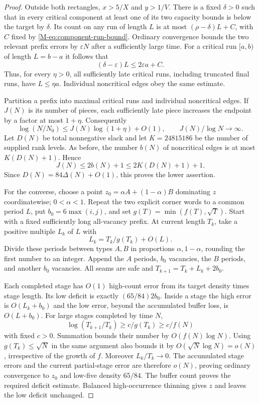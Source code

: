 \documentclass[11pt,reqno]{amsart}
\theoremstyle{plain}
\theoremstyle{plain}
\theoremstyle{plain}
\begin{document}
\begin{proof}
Outside both rectangles, $x>5/X$ and $y>1/V$. There is a fixed
$\delta>0$ such that in every critical component at least one of its
two capacity bounds is below the target by $\delta$. Its count on
any run of length $L$ is at most $(\rho-\delta)L+C$, with $C$ fixed
by \eqref{M-eq:component-run-bound}. Ordinary convergence bounds the
two relevant prefix errors by $\varepsilon N$ after a sufficiently
large time. For a critical run $[a,b)$ of length $L=b-a$ it follows that
\[
 (\delta-\varepsilon)L\le2\varepsilon a+C.
\]
Thus, for every $\eta>0$, all sufficiently late critical runs, including
truncated final runs, have $L\le\eta a$. Individual noncritical edges
obey the same estimate.

Partition a prefix into maximal critical runs and individual
noncritical edges. If $J(N)$ is its number of pieces, each sufficiently
late piece increases the endpoint by a factor at most $1+\eta$.
Consequently
\[
 \log(N/N_0)\le J(N)\log(1+\eta)+O(1),\qquad
 J(N)/\log N\longrightarrow\infty.
\]
Let $D(N)$ be total nonnegative slack and let $K=24815186$ be the
number of supplied rank levels. As before, the number $b(N)$ of
noncritical edges is at most $K(D(N)+1)$. Hence
\[
 J(N)\le2b(N)+1\le2K(D(N)+1)+1.
\]
Since $D(N)=84\Delta(N)+O(1)$, this proves the lower assertion.

For the converse, choose a point
$z_0=\alpha A+(1-\alpha)B$ dominating $z$ coordinatewise;
$0<\alpha<1$. Repeat the two explicit corner words to a common
period $L$, put $b_0=6\max(i,j)$, and set
$g(T)=\min(f(T),\sqrt T)$. Start with a fixed sufficiently long
all-vacancy prefix. At current length $T_k$, take a positive multiple
$L_k$ of $L$ with
\[
 L_k=T_k/g(T_k)+O(L).
\]
Divide these periods between types $A,B$ in proportions
$\alpha,1-\alpha$, rounding the first number to an integer. Append
the $A$ periods, $b_0$ vacancies, the $B$ periods, and another
$b_0$ vacancies. All seams are safe and
$T_{k+1}=T_k+L_k+2b_0$.

Each completed stage has $O(1)$ high-count error from its target
density times stage length. Its low deficit is exactly
$(65/84)2b_0$. Inside a stage the high error is $O(L_k+b_0)$ and
the low error, beyond the accumulated buffer loss, is $O(L+b_0)$.
For large stages completed by time $N$,
\[
 \log(T_{k+1}/T_k)\ge c/g(T_k)\ge c/f(N)
\]
with fixed $c>0$. Summation bounds their number by $O(f(N)\log N)$.
Using $g(T_k)\le\sqrt N$ in the same argument also bounds it by
$O(\sqrt N\log N)=o(N)$, irrespective of the growth of $f$.
Moreover $L_k/T_k\to0$. The accumulated stage errors and the current
partial-stage error are therefore $o(N)$, proving ordinary convergence
to $z_0$ and low-five density $65/84$. The buffer count proves the
required deficit estimate. Balanced high-occurrence thinning gives $z$
and leaves the low deficit unchanged.
\end{proof}
\end{document}
